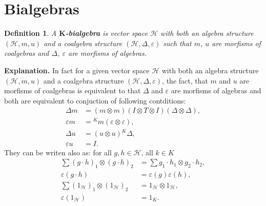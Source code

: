 \documentclass[a4paper, 12pt]{report}
\newtheorem{definition}{Definition}
\begin{document}
\section{Bialgebras}
\begin{definition}
A \textbf{$\textbf{K}$-bialgebra} is vector space $\mathcal{H}$ with both an algebra structure
$(\mathcal{H}, m, u)$ and a coalgebra structure $(\mathcal{H}, \Delta, \varepsilon)$ such that $m$, $u$
are morfisms of coalgebras and $\Delta$, $\varepsilon$ are morfisms of algebras.
\end{definition}
\textbf{Explanation. } In fact for a given vector space $\mathcal{H}$ with both an algebra structure
$(\mathcal{H}, m, u)$ and a coalgebra structure $(\mathcal{H}, \Delta, \varepsilon)$, the fact, that
$m$ and $u$ are morfisms of coalgebras is equivalent to that $\Delta$ and $\varepsilon$ are morfisms of
algebras and both are equivalent to conjuction of following contditions:
\begin{align*}
\Delta m &= (m\otimes m)(I \otimes T \otimes I)(\Delta \otimes \Delta), \\
\varepsilon m &= {^Km}(\varepsilon \otimes \varepsilon), \\
\Delta u &= (u \otimes u){^K\Delta}, \\
\varepsilon u &= I.
\end{align*}
They can be writen also as: for all $g, h \in \mathcal{H}$, all $k \in K$
\begin{align*}
\sum (g \cdot h)_1 \otimes (g \cdot h)_2 &= \sum g_1 \cdot h_1 \otimes g_2 \cdot h_2, \\
\varepsilon(g \cdot h) &= \varepsilon(g)\varepsilon(h), \\
\sum (1_\mathcal{H})_1 \otimes (1_\mathcal{H})_2 &= 1_\mathcal{H} \otimes 1_\mathcal{H}, \\
\varepsilon (1_\mathcal{H}) &= 1_K.
\end{align*}
\end{document}
